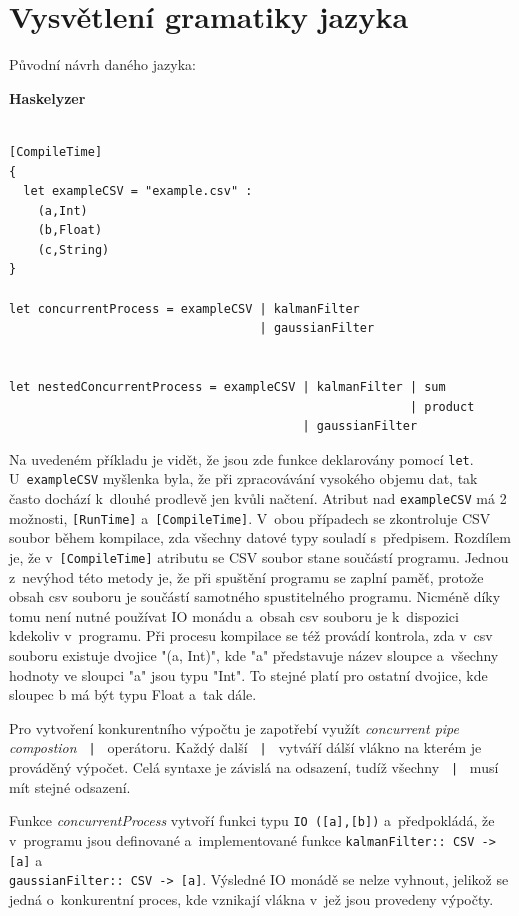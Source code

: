 \documentclass[male, czech]{kithesis}
\newcommand{\haskellInline}[1]{\colorbox{gray!10}{\texttt{#1}}}
\begin{document}
\section{Vysvětlení gramatiky jazyka}


\setlength{\parindent}{0pt}
Původní návrh daného jazyka:

\textbf{Haskelyzer}
\begin{verbatim}

[CompileTime]
{
  let exampleCSV = "example.csv" :
    (a,Int)
    (b,Float)
    (c,String)
}

let concurrentProcess = exampleCSV | kalmanFilter 
                                   | gaussianFilter 
                                      

let nestedConcurrentProcess = exampleCSV | kalmanFilter | sum
                                                        | product
                                         | gaussianFilter

\end{verbatim}

Na uvedeném příkladu je vidět,
že jsou zde funkce deklarovány pomocí \haskellInline{let}.
U~\haskellInline{exampleCSV} myšlenka byla, 
že při zpracovávání vysokého objemu dat,
tak často dochází k~dlouhé prodlevě jen kvůli načtení.
Atribut nad \haskellInline{exampleCSV} 
má 2 možnosti, 
\haskellInline{[RunTime]} a~\haskellInline{[CompileTime]}.
V~obou případech se
zkontroluje CSV soubor během kompilace, 
zda všechny datové typy souladí s~předpisem.
Rozdílem je, 
že v~\haskellInline{[CompileTime]} atributu se CSV soubor
stane součástí programu. 
Jednou z~nevýhod této metody je, 
že při spuštění programu se zaplní paměť, 
protože obsah csv souboru je součástí samotného spustitelného programu.
Nicméně díky tomu není nutné používat IO monádu
a~obsah csv souboru je k~dispozici kdekoliv v~programu.
Při procesu kompilace se též provádí kontrola, 
zda v~csv souboru existuje dvojice "(a, Int)", 
kde "a" představuje název sloupce
a~všechny hodnoty ve sloupci "a" jsou typu "Int".
To stejné platí pro ostatní dvojice, 
kde sloupec b má být typu Float a~tak dále.

Pro vytvoření konkurentního výpočtu je zapotřebí využít \textit{concurrent pipe compostion}
\haskellInline{ | } operátoru. 
Každý další \haskellInline{ | } vytváří dálší vlákno na kterém je prováděný výpočet.
Celá syntaxe je závislá na odsazení, 
tudíž všechny \haskellInline{ | } musí mít stejné odsazení.

Funkce \textit{concurrentProcess} vytvoří funkci typu \haskellInline{IO ([a],[b])}
a~předpokládá, 
že v~programu jsou definované a~implementované funkce
\haskellInline{kalmanFilter:: CSV -> [a]} a~\\
\haskellInline{gaussianFilter:: CSV -> [a]}. 
Výsledné IO monádě se nelze vyhnout, 
jelikož se jedná o~konkurentní proces, 
kde vznikají vlákna v~jež jsou provedeny výpočty. 
\end{document}
